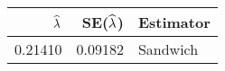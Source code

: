 \begin{table}[ht]
\centering
\begin{tabular}{rrl}
  \hline
$\widehat{\lambda}$ & SE($\widehat{\lambda}$) & Estimator \\ 
  \hline
0.21410 & 0.09182 & Sandwich \\ 
   \hline
\end{tabular}
\end{table}
